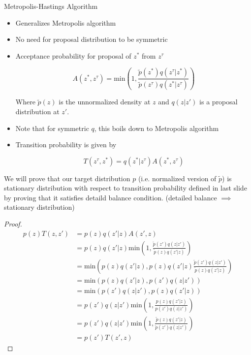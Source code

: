 \documentclass[pdf]{beamer}
\begin{document}
\begin{frame}{Metropolis-Hastings Algorithm}
  \begin{itemize}
  \item Generalizes Metropolis algorithm
  \item No need for proposal distribution to be symmetric
  \item Acceptance probability for proposal of $z^*$ from $z^\tau$

    \[
      A(z^*, z^\tau) = \text{min} \left( 1, \frac{\tilde{p}(z^*) q(z^\tau|z^*)}{\tilde{p}(z^\tau) q(z^*|z^\tau)} \right)
    \]

    Where $\tilde{p}(z)$ is the unnormalized density at $z$ and $q(z|z')$ is a proposal distribution at $z'$.
  \item Note that for symmetric $q$, this boils down to Metropolis algorithm
  \item Transition probability is given by

    \[
      T(z^\tau, z^*) = q(z^*|z^\tau) A(z^*, z^\tau)
    \]
    
  \end{itemize}
\end{frame}

\begin{frame}
  We will prove that our target distribution $p$ (i.e. normalized version of $\tilde{p}$) is stationary distribution with respect to transition probability defined in last slide by proving that it satisfies detaild balance condition. (detailed balance $\implies$ stationary distribution)

\end{frame}
\begin{frame}
  \begin{proof}
    \begin{align*}
      p(z)T(z, z') &= p(z) q(z'|z) A(z', z) \\
                   &= p(z) q(z'|z)  \text{min} \left( 1, \frac{\tilde{p}(z') q(z|z')}{\tilde{p}(z) q(z'|z)} \right) \\
                   &= \text{min} \left( p(z) q(z'|z) , p(z) q(z'|z) \frac{\tilde{p}(z') q(z|z')}{\tilde{p}(z) q(z'|z)} \right) \\
                   &= \text{min} ( p(z) q(z'|z) , p(z') q(z|z')) \\
                   &= \text{min} ( p(z') q(z|z') , p(z) q(z'|z)) \\
                   &=  p(z') q(z|z') \text{min} \left(1 , \frac{p(z) q(z'|z)}{p(z') q(z|z')}\right) \\
                   &=  p(z') q(z|z') \text{min} \left(1 , \frac{\tilde{p}(z) q(z'|z)}{\tilde{p}(z') q(z|z')}\right)\\
                   &= p(z') T(z', z)
    \end{align*}
  \end{proof}
\end{frame}
\end{document}
